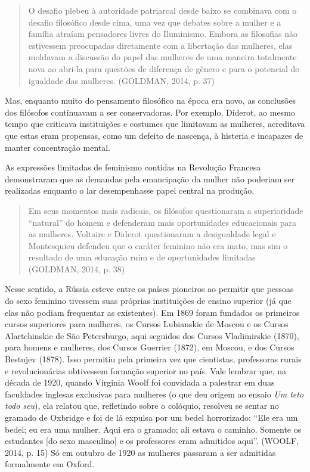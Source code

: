 \documentclass{article}
\begin{document}
\begin{quote}
O desafio plebeu à autoridade patriarcal desde baixo se combinava com o
desafio filosófico desde cima, uma vez que debates sobre a mulher e a
família atraíam pensadores livres do Iluminismo. Embora as filosofias
não estivessem preocupadas diretamente com a libertação das mulheres,
elas moldavam a discussão do papel das mulheres de uma maneira
totalmente nova ao abri-la para questões de diferença de gênero e para o
potencial de igualdade das mulheres. (GOLDMAN, 2014, p. 37)
\end{quote}

Mas, enquanto muito do pensamento filosófico na época era novo, as
conclusões dos filósofos continuavam a ser conservadoras. Por exemplo,
Diderot, ao mesmo tempo que criticava instituições e costumes que
limitavam as mulheres, acreditava que estas eram propensas, como um
defeito de nascença, à histeria e incapazes de manter concentração
mental.

As expressões limitadas de feminismo contidas na Revolução Francesa
demonstraram que as demandas pela emancipação da mulher não poderiam ser
realizadas enquanto o lar desempenhasse papel central na produção.

\begin{quote}
Em seus momentos mais radicais, os filósofos questionaram a
superioridade ``natural'' do homem e defenderam mais oportunidades
educacionais para as mulheres. Voltaire e Diderot questionaram a
desigualdade legal e Montesquieu defendeu que o caráter feminino não era
inato, mas sim o resultado de uma educação ruim e de oportunidades
limitadas (GOLDMAN, 2014, p. 38)
\end{quote}

Nesse sentido, a Rússia esteve
entre os países pioneiros ao permitir que pessoas do sexo feminino
tivessem suas próprias instituições de ensino superior (já que elas não
podiam frequentar as existentes). Em 1869 foram fundados os primeiros
cursos superiores para mulheres, os Cursos Lubianskie de Moscou e os
Cursos Alartchinskie de São Petersburgo, aqui seguidos dos Cursos
Vladimirskie (1870), para homens e mulheres, dos Cursos Guerrier (1872),
em Moscou, e dos Cursos Bestujev (1878). Isso permitiu pela primeira vez
que cientistas, professoras rurais e revolucionárias obtivessem formação
superior no país. Vale lembrar que, na década de 1920, quando Virginia
Woolf foi convidada a palestrar em duas faculdades inglesas exclusivas
para mulheres (o que deu origem ao ensaio \emph{Um teto todo seu}), ela
relatou que, refletindo sobre o colóquio, resolveu se sentar no gramado
de Oxbridge e foi de lá expulsa por um bedel horrorizado: ``Ele era um
bedel; eu era uma mulher. Aqui era o gramado; ali estava o caminho.
Somente os estudantes {[}do sexo masculino{]} e os professores eram
admitidos aqui''. (WOOLF, 2014, p. 15) Só em outubro de 1920 as mulheres
passaram a ser admitidas formalmente em Oxford.
\end{document}
